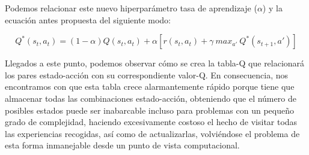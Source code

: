 Podemos relacionar este nuevo hiperparámetro tasa de aprendizaje ($\alpha$) y la ecuación antes propuesta del siguiente modo:

$$Q^*(s_{t}, a_{t}) = (1-\alpha ) Q(s_{t}, a_{t}) + \alpha [r(s_{t}, a_{t}) + \gamma\ max_{a'}\ Q^*(s_{t+1}, a')]$$

Llegados a este punto, podemos observar cómo se crea la tabla-Q que relacionará los pares estado-acción con su correspondiente valor-Q. En consecuencia, nos encontramos con que esta tabla crece alarmantemente rápido porque tiene que almacenar todas las combinaciones estado-acción, obteniendo que el número de posibles estados puede ser inabarcable incluso para problemas con un pequeño grado de complejidad, haciendo excesivamente costoso el hecho de visitar todas las experiencias recogidas, así como de actualizarlas, volviéndose el problema de esta forma inmanejable desde un punto de vista computacional.